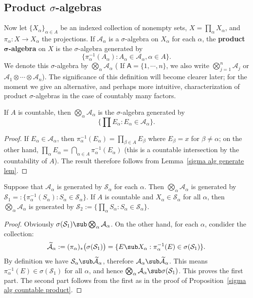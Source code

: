 \subsection{Product \boldmath$\sigma$-algebras}
Now let $\{X_\alpha\}_{\alpha\in A}$ be an indexed collection of nonempty sets, $X=\prod_{\alpha}X_\alpha$, and $\pi_\alpha:X\to X_\alpha$ the projections. 
If $\mathcal{A}_\alpha$ is a $\sigma$-algebra on $X_\alpha$ for each $\alpha$, the \textbf{product $\bm{\sigma}$-algebra} on $X$ is the $\sigma$-algebra generated by
\[\{\pi^{-1}_{\alpha}(A_\alpha):A_\alpha\in\mathcal{A}_\alpha,\alpha\in A\}.\]
We denote this $\sigma$-algebra by $\bigotimes_{\alpha}\mathcal{A}_\alpha$ ( If $\mathsf{A}=\{1,\cdots,n\}$, we also write $\bigotimes_{j=1}^{n}\mathcal{A}_j$ or 
$\mathcal{A}_1\otimes\cdots\otimes\mathcal{A}_n$). The significance of this definition will become clearer later; for the moment we give an alternative, and perhaps more intuitive, characterization of product $\sigma$-algebras in the case of countably many factors.
\begin{proposition}\label{sigma alg countable product}
If $A$ is countable, then $\bigotimes_{\alpha}\mathcal{A}_\alpha$ is the $\sigma$-algebra generated by
\[\{\prod E_\alpha:E_\alpha\in\mathcal{A}_\alpha\}.\]
\end{proposition}
\begin{proof}
If $E_\alpha\in\mathcal{A}_\alpha$, then $\pi_\alpha^{-1}(E_\alpha)=\prod_{\beta\in A}E_\beta$ where $E_\beta=x$ for $\beta\neq\alpha$; on the other hand, $\prod_{\alpha}E_\alpha=\bigcap_{\alpha\in A}\pi_\alpha^{-1}(E_\alpha)$ (this is a countable intersection by the countability of $A$). The result therefore follows from Lemma~\ref{sigma alg generate lem}.
\end{proof}
\begin{proposition}\label{sigma alg product generator}
Suppose that $\mathcal{A}_\alpha$ is generated by $\mathcal{S}_\alpha$ for each $\alpha$. Then $\bigotimes_{\alpha}\mathcal{A}_\alpha$ is generated by 
$\mathcal{S}_1=:\{\pi_\alpha^{-1}(S_\alpha):S_\alpha\in\mathcal{S}_\alpha\}$. If $A$ is countable and $X_\alpha\in\mathcal{S}_\alpha$ for all $\alpha$, then 
$\bigotimes_{\alpha}\mathcal{A}_\alpha$ is generated by $\mathcal{S}_2:=\{\prod_\alpha S_\alpha:S_\alpha\in\mathcal{S}_\alpha\}$.
\end{proposition}
\begin{proof}
Obviously $\sigma(\mathcal{S}_1)\sub\bigotimes_{\alpha}\mathcal{A}_\alpha$. On the other hand, for each $\alpha$, condider the collection:
\[\widetilde{\mathcal{A}}_\alpha:=(\pi_\alpha)_*\big(\sigma(\mathcal{S}_1)\big)=\{E\sub X_\alpha:\pi_\alpha^{-1}(E)\in\sigma(\mathcal{S}_1)\}.\]
By definition we have $\mathcal{S}_\alpha\sub\widetilde{\mathcal{A}}_\alpha$, therefore $\mathcal{A}_\alpha\sub\widetilde{\mathcal{A}}_\alpha$. This means $\pi_\alpha^{-1}(E)\in\sigma(\mathcal{S}_1)$ for all $\alpha$, and hence $\bigotimes_{\alpha}\mathcal{A}_\alpha\sub\sigma(\mathcal{S}_1)$. This proves the first part. The second part follows from the first as in the proof of Proposition~\ref{sigma alg countable product}.
\end{proof}
